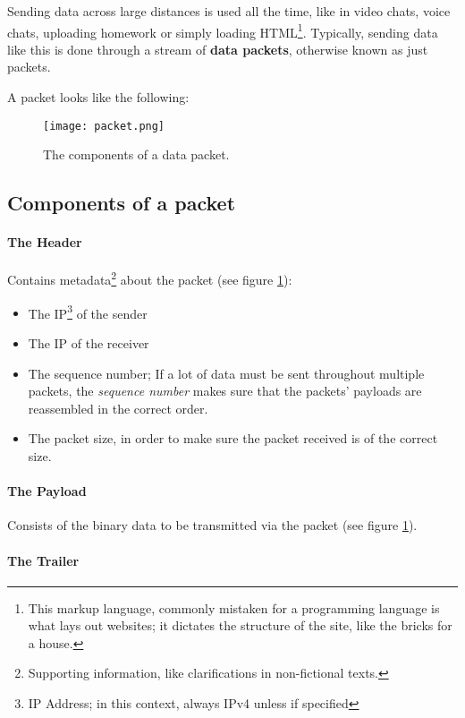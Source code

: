 \documentclass[../main.tex]{subfiles}
\begin{document}
Sending data across large distances is used all the time, like in video chats, voice chats, uploading homework or simply loading HTML\footnote{This markup language, commonly mistaken for a programming language is what lays out websites; it dictates the structure of the site, like the bricks for a house.}. Typically, sending data like this is done through a stream of \textbf{data packets}, otherwise known as just packets.

A packet looks like the following:

\begin{figure}[h]
    \centering
    \texttt{[image: packet.png]}
    \caption{The components of a data packet.}
    \label{fig:packet}
\end{figure}

\subsection{Components of a packet}

\paragraph{The Header}

Contains metadata\footnote{Supporting information, like clarifications in non-fictional texts.} about the packet (see figure \ref{fig:packet}):

\begin{itemize}
    \item The IP\footnote{IP Address; in this context, always IPv4 unless if specified} of the sender
    \item The IP of the receiver
    \item The sequence number; If a lot of data must be sent throughout multiple packets, the
          \emph{sequence number} makes sure that the packets' payloads are reassembled in the correct order.
    \item The packet size, in order to make sure the packet received is of the correct size.
\end{itemize}

\paragraph{The Payload}

Consists of the binary data to be transmitted via the packet (see figure \ref{fig:packet}).

\paragraph{The Trailer}
\end{document}

